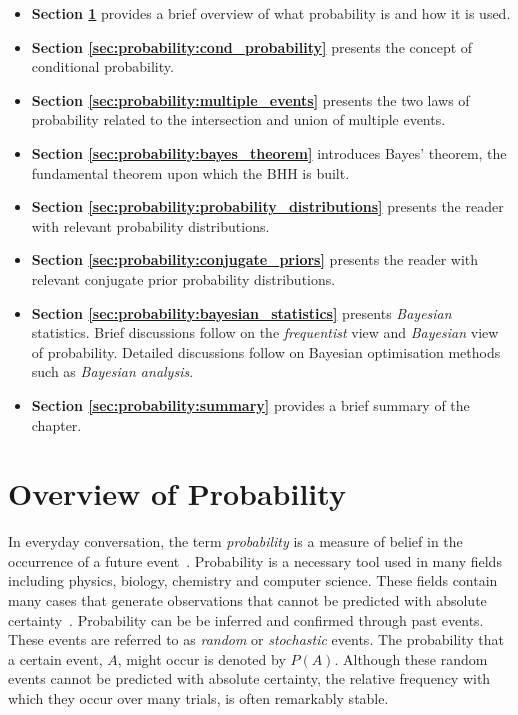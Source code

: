 \begin{itemize}
      \item \textbf{Section \ref{sec:probability:overview}} provides a brief overview of what probability is and how it is used.

      \item \textbf{Section \ref{sec:probability:cond_probability}} presents the concept of conditional probability.

      \item \textbf{Section \ref{sec:probability:multiple_events}} presents the two laws of probability related to the intersection and union of multiple events.

      \item \textbf{Section \ref{sec:probability:bayes_theorem}} introduces Bayes' theorem, the fundamental theorem upon which the \acs{BHH} is built.

      \item \textbf{Section \ref{sec:probability:probability_distributions}} presents the reader with relevant probability distributions.

      \item \textbf{Section \ref{sec:probability:conjugate_priors}} presents the reader with relevant conjugate prior probability distributions.

      \item \textbf{Section \ref{sec:probability:bayesian_statistics}} presents \textit{Bayesian} statistics. Brief discussions follow on the \textit{frequentist} view and \textit{Bayesian} view of probability. Detailed discussions follow on Bayesian optimisation methods such as \textit{Bayesian analysis}.

      \item \textbf{Section \ref{sec:probability:summary}} provides a brief summary of the chapter.
\end{itemize}


\section{Overview of Probability}\label{sec:probability:overview}

In everyday conversation, the term \textit{probability} is a measure of belief in the occurrence of a future event~\cite{ref:wackerly:2014}. Probability is a necessary tool used in many fields including physics, biology, chemistry and computer science. These fields contain many cases that generate observations that cannot be predicted with absolute certainty~\cite{ref:wackerly:2014}. Probability can be be inferred and confirmed through past events. These events are referred to as \textit{random} or \textit{stochastic} events. The probability that a certain event, $A$, might occur is denoted by $P(A)$. Although these random events cannot be predicted with absolute certainty, the relative frequency with which they occur over many trials, is often remarkably stable.

